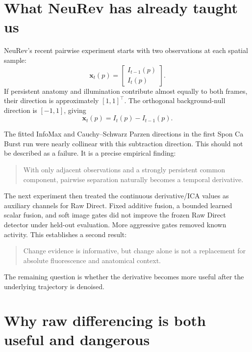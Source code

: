 \documentclass[11pt]{article}
\begin{document}
\section{What NeuRev has already taught us}

NeuRev's recent pairwise experiment starts with two observations at each spatial
sample:
\begin{equation}
\bm x_t(p)
=
\begin{bmatrix}
I_{t-1}(p)\\
I_t(p)
\end{bmatrix}.
\end{equation}
If persistent anatomy and illumination contribute almost equally to both
frames, their direction is approximately
\([1,1]^\top\). The orthogonal background-null direction is
\([-1,1]\), giving
\begin{equation}
[-1,1]\bm x_t(p)=I_t(p)-I_{t-1}(p).
\end{equation}

The fitted InfoMax and Cauchy--Schwarz Parzen directions in the first Spon Ca
Burst run were nearly collinear with this subtraction direction. This should not
be described as a failure. It is a precise empirical finding:

\begin{quote}
With only adjacent observations and a strongly persistent common component,
pairwise separation naturally becomes a temporal derivative.
\end{quote}

The next experiment then treated the continuous derivative/ICA values as
auxiliary channels for Raw Direct. Fixed additive fusion, a bounded learned
scalar fusion, and soft image gates did not improve the frozen Raw Direct
detector under held-out evaluation. More aggressive gates removed known
activity. This establishes a second result:

\begin{quote}
Change evidence is informative, but change alone is not a replacement for
absolute fluorescence and anatomical context.
\end{quote}

The remaining question is whether the derivative becomes more useful after the
underlying trajectory is denoised.

\section{Why raw differencing is both useful and dangerous}
\end{document}
